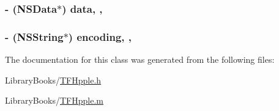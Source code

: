 \subsubsection[{data}]{\setlength{\rightskip}{0pt plus 5cm}-\/ (N\+S\+Data$\ast$) data\hspace{0.3cm}{\ttfamily [read]}, {\ttfamily [nonatomic]}, {\ttfamily [assign]}}\label{interface_t_f_hpple_af8002e454472111f4af37d7b48ccbade}
\hypertarget{interface_t_f_hpple_a790232945cc92e254fb9788089273d1f}{}
\subsubsection[{encoding}]{\setlength{\rightskip}{0pt plus 5cm}-\/ (N\+S\+String$\ast$) encoding\hspace{0.3cm}{\ttfamily [read]}, {\ttfamily [nonatomic]}, {\ttfamily [assign]}}\label{interface_t_f_hpple_a790232945cc92e254fb9788089273d1f}


The documentation for this class was generated from the following files\+:\begin{DoxyCompactItemize}
\item 
Library\+Books/\hyperlink{_t_f_hpple_8h}{T\+F\+Hpple.\+h}\item 
Library\+Books/\hyperlink{_t_f_hpple_8m}{T\+F\+Hpple.\+m}\end{DoxyCompactItemize}
